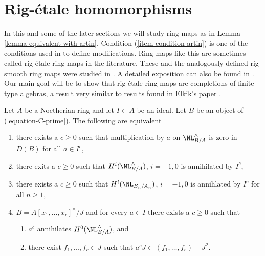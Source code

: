 \section{Rig-\'etale homomorphisms}
\label{section-rig-etale}

\noindent
In this and some of the later sections we will study ring maps as
in Lemma \ref{lemma-equivalent-with-artin}. Condition
(\ref{item-condition-artin}) is one of the conditions used in
\cite{ArtinII} to define modifications. Ring maps like this are sometimes
called rig-\'etale ring maps in the literature. These and
the analogously defined rig-smooth ring maps were studied
in \cite{Elkik}. A detailed exposition can also be found in
\cite{Abbes}. Our main goal will be to show that rig-\'etale
ring maps are completions of finite type algebras, a result
very similar to results found in Elkik's paper \cite{Elkik}.

\begin{lemma}
\label{lemma-equivalent-with-artin}
Let $A$ be a Noetherian ring and let $I \subset A$ be an ideal.
Let $B$ be an object of (\ref{equation-C-prime}). The following are equivalent
\begin{enumerate}
\item
\label{item-zero-on-NL}
there exists a $c \geq 0$ such that multiplication by $a$
on $\NL^\wedge_{B/A}$ is zero in $D(B)$ for all $a \in I^c$,
\item
\label{item-zero-on-cohomology-NL}
there exits a $c \geq 0$ such that $H^i(\NL^\wedge_{B/A})$, $i = -1, 0$ is
annihilated by $I^c$,
\item
\label{item-zero-on-cohomology-NL-truncations}
there exists a $c \geq 0$ such that $H^i(\NL_{B_n/A_n})$, $i = -1, 0$ is
annihlated by $I^c$ for all $n \geq 1$,
\item
\label{item-condition-artin}
$B = A[x_1, \ldots, x_r]^\wedge/J$ and
for every $a \in I$ there exists a $c \geq 0$ such that
\begin{enumerate}
\item $a^c$ annihilates $H^0(\NL^\wedge_{B/A})$, and
\item there exist $f_1, \ldots, f_r \in J$ such that
$a^c J \subset (f_1, \ldots, f_r) + J^2$.
\end{enumerate}
\end{enumerate}
\end{lemma}

